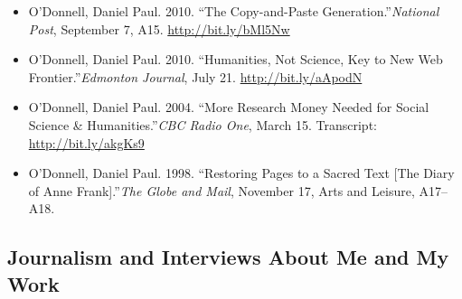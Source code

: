 \documentclass[12pt]{article}
\begin{document}
\begin{itemize}
  \item O’Donnell, Daniel Paul. 2010. “The Copy-and-Paste Generation.”\textit{National Post}, September 7, A15. \url{http://bit.ly/bMl5Nw}
  \item O’Donnell, Daniel Paul. 2010. “Humanities, Not Science, Key to New Web Frontier.”\textit{Edmonton Journal}, July 21. \url{http://bit.ly/aApodN}
  \item O’Donnell, Daniel Paul. 2004. “More Research Money Needed for Social Science \& Humanities.”\textit{CBC Radio One}, March 15. Transcript: \url{http://bit.ly/akgKs9}
  \item O’Donnell, Daniel Paul. 1998. “Restoring Pages to a Sacred Text [The Diary of Anne Frank].”\textit{The Globe and Mail}, November 17, Arts and Leisure, A17–A18.
\end{itemize}


\subsection*{Journalism and Interviews About Me and My Work}
\end{document}
